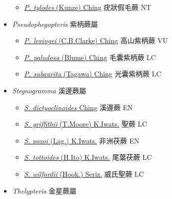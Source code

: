 \begin{itemize}
  \begin{itemize}
        \item[] \href{http://www.theplantlist.org/tpl1.1/search?q=Pseudocyclosorus+tylodes}{\textit{P. tylodes} (Kunze) Ching}   疣狀假毛蕨   NT
  \end{itemize}
 \item[    ] \textit{Pseudophegopteris} 紫柄蕨屬
                                
  \begin{itemize}
        \item[] \href{http://www.theplantlist.org/tpl1.1/search?q=Pseudophegopteris+levingei}{\textit{P. levingei} (C.B.Clarke) Ching}   高山紫柄蕨   VU
        \item[] \href{http://www.theplantlist.org/tpl1.1/search?q=Pseudophegopteris+paludosa}{\textit{P. paludosa} (Blume) Ching}   毛囊紫柄蕨   LC
        \item[] \href{http://www.theplantlist.org/tpl1.1/search?q=Pseudophegopteris+subaurita}{\textit{P. subaurita} (Tagawa) Ching}   光囊紫柄蕨   LC
  \end{itemize}
 \item[    ] \textit{Stegnogramma} 溪邊蕨屬
                                
  \begin{itemize}
        \item[] \href{http://www.theplantlist.org/tpl1.1/search?q=Stegnogramma+dictyoclinoides}{\textit{S. dictyoclinoides} Ching}   溪邊蕨   EN
        \item[] \href{http://www.theplantlist.org/tpl1.1/search?q=Stegnogramma+griffithii}{\textit{S. griffithii} (T.Moore) K.Iwats.}   聖蕨   LC
        \item[] \href{http://www.theplantlist.org/tpl1.1/search?q=Stegnogramma+pozoi}{\textit{S. pozoi} (Lag.) K.Iwats.}   非洲茯蕨   EN
        \item[] \href{http://www.theplantlist.org/tpl1.1/search?q=Stegnogramma+tottoides}{\textit{S. tottoides} (H.Ito) K.Iwats.}   尾葉茯蕨   LC
        \item[] \href{http://www.theplantlist.org/tpl1.1/search?q=Stegnogramma+wilfordii}{\textit{S. wilfordii} (Hook.) Seriz.}   威氏聖蕨   LC
  \end{itemize}
 \item[    ] \textit{Thelypteris} 金星蕨屬
                                

\end{itemize}
